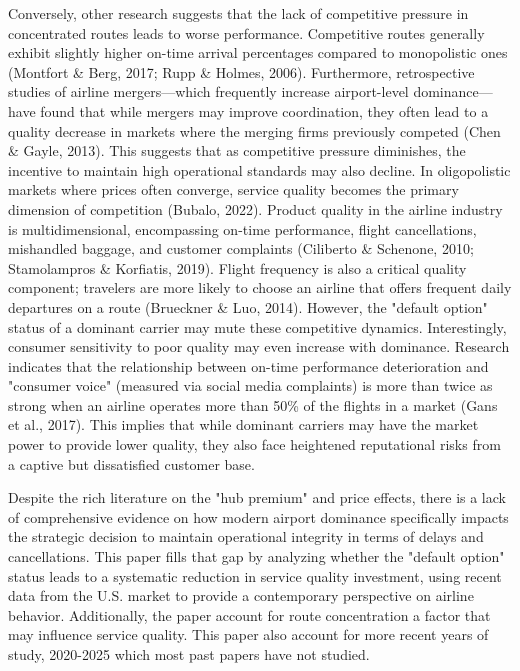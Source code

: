 \documentclass[preprint,12pt,authoryear]{elsarticle}
\begin{document}
Conversely, other research suggests that the lack of competitive pressure in concentrated routes leads to worse performance. Competitive routes generally exhibit slightly higher on-time arrival percentages compared to monopolistic ones (Montfort \& Berg, 2017; Rupp \& Holmes, 2006). Furthermore, retrospective studies of airline mergers—which frequently increase airport-level dominance—have found that while mergers may improve coordination, they often lead to a quality decrease in markets where the merging firms previously competed (Chen \& Gayle, 2013). This suggests that as competitive pressure diminishes, the incentive to maintain high operational standards may also decline.
In oligopolistic markets where prices often converge, service quality becomes the primary dimension of competition (Bubalo, 2022). Product quality in the airline industry is multidimensional, encompassing on-time performance, flight cancellations, mishandled baggage, and customer complaints (Ciliberto \& Schenone, 2010; Stamolampros \& Korfiatis, 2019). Flight frequency is also a critical quality component; travelers are more likely to choose an airline that offers frequent daily departures on a route (Brueckner \& Luo, 2014).
However, the "default option" status of a dominant carrier may mute these competitive dynamics. Interestingly, consumer sensitivity to poor quality may even increase with dominance. Research indicates that the relationship between on-time performance deterioration and "consumer voice" (measured via social media complaints) is more than twice as strong when an airline operates more than 50\% of the flights in a market (Gans et al., 2017). This implies that while dominant carriers may have the market power to provide lower quality, they also face heightened reputational risks from a captive but dissatisfied customer base.


Despite the rich literature on the "hub premium" and price effects, there is a lack of comprehensive evidence on how modern airport dominance specifically impacts the strategic decision to maintain operational integrity in terms of delays and cancellations. This paper fills that gap by analyzing whether the "default option" status leads to a systematic reduction in service quality investment, using recent data from the U.S. market to provide a contemporary perspective on airline behavior. Additionally, the paper account for route concentration a factor that may influence service quality. This paper also account for more recent years of study, 2020-2025 which most past papers have not studied.
\end{document}
